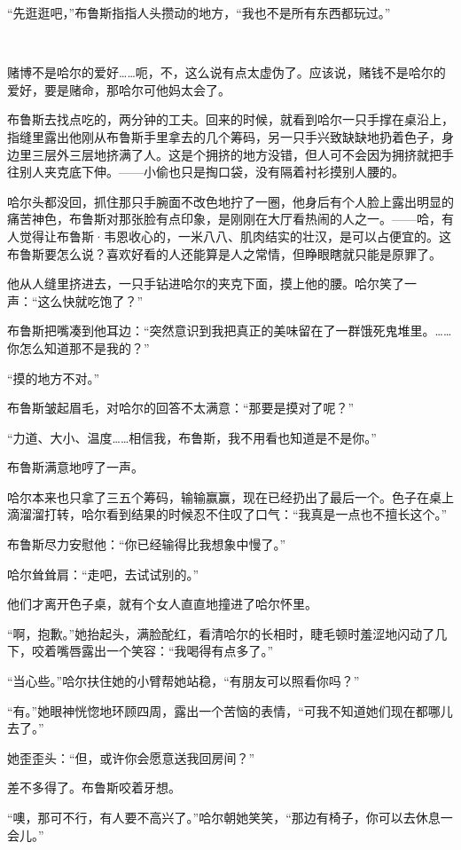 \documentclass[../main]{subfiles}
\begin{document}
“先逛逛吧，”布鲁斯指指人头攒动的地方，“我也不是所有东西都玩过。”

~\

赌博不是哈尔的爱好……呃，不，这么说有点太虚伪了。应该说，赌钱不是哈尔的爱好，要是赌命，那哈尔可他妈太会了。

布鲁斯去找点吃的，两分钟的工夫。回来的时候，就看到哈尔一只手撑在桌沿上，指缝里露出他刚从布鲁斯手里拿去的几个筹码，另一只手兴致缺缺地扔着色子，身边里三层外三层地挤满了人。这是个拥挤的地方没错，但人可不会因为拥挤就把手往别人夹克底下伸。——小偷也只是掏口袋，没有隔着衬衫摸别人腰的。

哈尔头都没回，抓住那只手腕面不改色地拧了一圈，他身后有个人脸上露出明显的痛苦神色，布鲁斯对那张脸有点印象，是刚刚在大厅看热闹的人之一。——哈，有人觉得让布鲁斯·韦恩收心的，一米八八、肌肉结实的壮汉，是可以占便宜的。这布鲁斯要怎么说？喜欢好看的人还能算是人之常情，但睁眼瞎就只能是原罪了。

他从人缝里挤进去，一只手钻进哈尔的夹克下面，摸上他的腰。哈尔笑了一声：“这么快就吃饱了？”

布鲁斯把嘴凑到他耳边：“突然意识到我把真正的美味留在了一群饿死鬼堆里。……你怎么知道那不是我的？”

“摸的地方不对。”

布鲁斯皱起眉毛，对哈尔的回答不太满意：“那要是摸对了呢？”

“力道、大小、温度……相信我，布鲁斯，我不用看也知道是不是你。”

布鲁斯满意地哼了一声。

哈尔本来也只拿了三五个筹码，输输赢赢，现在已经扔出了最后一个。色子在桌上滴溜溜打转，哈尔看到结果的时候忍不住叹了口气：“我真是一点也不擅长这个。”

布鲁斯尽力安慰他：“你已经输得比我想象中慢了。”

哈尔耸耸肩：“走吧，去试试别的。”

他们才离开色子桌，就有个女人直直地撞进了哈尔怀里。

“啊，抱歉。”她抬起头，满脸酡红，看清哈尔的长相时，睫毛顿时羞涩地闪动了几下，咬着嘴唇露出一个笑容：“我喝得有点多了。”

“当心些。”哈尔扶住她的小臂帮她站稳，“有朋友可以照看你吗？”

“有。”她眼神恍惚地环顾四周，露出一个苦恼的表情，“可我不知道她们现在都哪儿去了。”

她歪歪头：“但，或许你会愿意送我回房间？”

差不多得了。布鲁斯咬着牙想。

“噢，那可不行，有人要不高兴了。”哈尔朝她笑笑，“那边有椅子，你可以去休息一会儿。”
\end{document}
